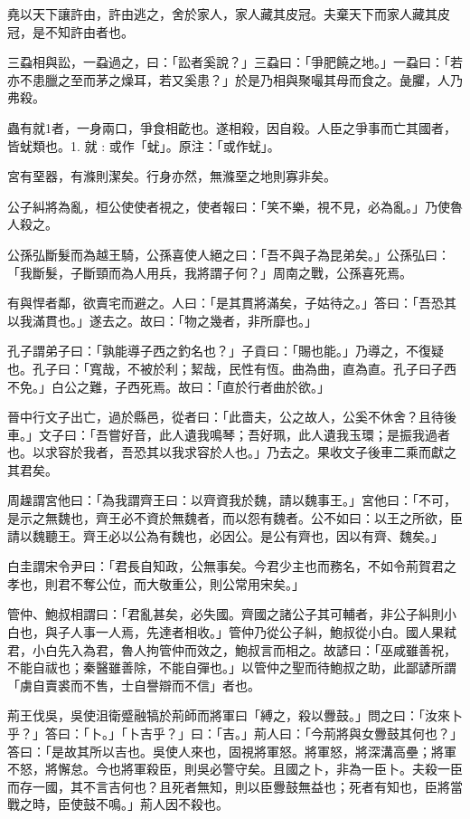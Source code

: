 \begin{pinyinscope}
堯以天下讓許由，許由逃之，舍於家人，家人藏其皮冠。夫棄天下而家人藏其皮冠，是不知許由者也。

三蝨相與訟，一蝨過之，曰：「訟者奚說？」三蝨曰：「爭肥饒之地。」一蝨曰：「若亦不患臘之至而茅之燥耳，若又奚患？」於是乃相與聚嘬其母而食之。彘臞，人乃弗殺。

蟲有就1者，一身兩口，爭食相齕也。遂相殺，因自殺。人臣之爭事而亡其國者，皆蚘類也。1. 就 : 或作「蚘」。原注：「或作蚘」。

宮有堊器，有滌則潔矣。行身亦然，無滌堊之地則寡非矣。

公子糾將為亂，桓公使使者視之，使者報曰：「笑不樂，視不見，必為亂。」乃使魯人殺之。

公孫弘斷髮而為越王騎，公孫喜使人絕之曰：「吾不與子為昆弟矣。」公孫弘曰：「我斷髮，子斷頸而為人用兵，我將謂子何？」周南之戰，公孫喜死焉。

有與悍者鄰，欲賣宅而避之。人曰：「是其貫將滿矣，子姑待之。」答曰：「吾恐其以我滿貫也。」遂去之。故曰：「物之幾者，非所靡也。」

孔子謂弟子曰：「孰能導子西之釣名也？」子貢曰：「賜也能。」乃導之，不復疑也。孔子曰：「寬哉，不被於利；絜哉，民性有恆。曲為曲，直為直。孔子曰子西不免。」白公之難，子西死焉。故曰：「直於行者曲於欲。」

晉中行文子出亡，過於縣邑，從者曰：「此嗇夫，公之故人，公奚不休舍？且待後車。」文子曰：「吾嘗好音，此人遺我鳴琴；吾好珮，此人遺我玉環；是振我過者也。以求容於我者，吾恐其以我求容於人也。」乃去之。果收文子後車二乘而獻之其君矣。

周趮謂宮他曰：「為我謂齊王曰：以齊資我於魏，請以魏事王。」宮他曰：「不可，是示之無魏也，齊王必不資於無魏者，而以怨有魏者。公不如曰：以王之所欲，臣請以魏聽王。齊王必以公為有魏也，必因公。是公有齊也，因以有齊、魏矣。」

白圭謂宋令尹曰：「君長自知政，公無事矣。今君少主也而務名，不如令荊賀君之孝也，則君不奪公位，而大敬重公，則公常用宋矣。」

管仲、鮑叔相謂曰：「君亂甚矣，必失國。齊國之諸公子其可輔者，非公子糾則小白也，與子人事一人焉，先達者相收。」管仲乃從公子糾，鮑叔從小白。國人果弒君，小白先入為君，魯人拘管仲而效之，鮑叔言而相之。故諺曰：「巫咸雖善祝，不能自祓也；秦醫雖善除，不能自彈也。」以管仲之聖而待鮑叔之助，此鄙諺所謂「虜自賣裘而不售，士自譽辯而不信」者也。

荊王伐吳，吳使沮衛蹙融犒於荊師而將軍曰「縛之，殺以釁鼓。」問之曰：「汝來卜乎？」答曰：「卜。」「卜吉乎？」曰：「吉。」荊人曰：「今荊將與女釁鼓其何也？」答曰：「是故其所以吉也。吳使人來也，固視將軍怒。將軍怒，將深溝高壘；將軍不怒，將懈怠。今也將軍殺臣，則吳必警守矣。且國之卜，非為一臣卜。夫殺一臣而存一國，其不言吉何也？且死者無知，則以臣釁鼓無益也；死者有知也，臣將當戰之時，臣使鼓不鳴。」荊人因不殺也。


\end{pinyinscope}
